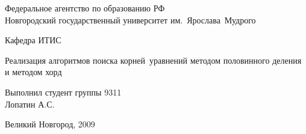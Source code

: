 \begin{titlepage}
\begin{center}

\fontsize{14pt}{18pt}
\selectfont

\vfill
Федеральное агентство по образованию РФ\\
Новгородский государственный университет им.~Ярослава~Мудрого

\hrulefill

Кафедра ИТИС

\vfill
\vfill

{
\huge
Реализация алгоритмов поиска корней~уравнений\linebreak
методом половинного деления и методом хорд
}

\vfill

{
\begin{flushright}
Выполнил студент группы 9311\\
Лопатин А.С.
\end{flushright}
}

\vfill

Великий Новгород, 2009
\end{center}
\end{titlepage}
